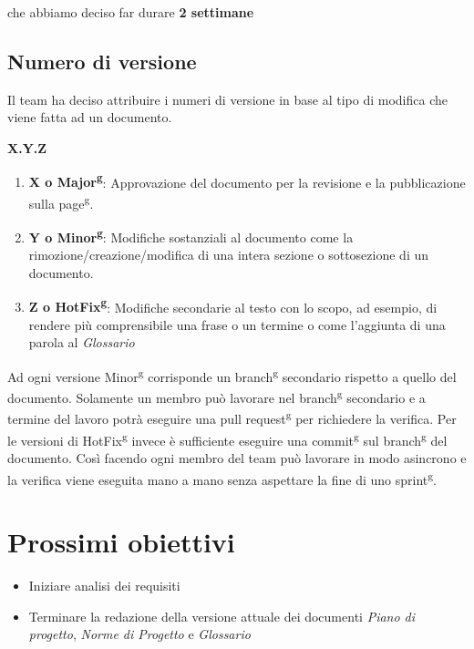 che abbiamo deciso far durare \textbf{2 settimane}
\subsection{Numero di versione}
Il team ha deciso attribuire i numeri di versione in base al tipo di modifica
che viene fatta ad un documento.
\begin{center}
    \textbf{X.Y.Z}
\end{center}
\begin{enumerate}
    \item \textbf{X o Major\textsuperscript{g}}: Approvazione del documento per la revisione e la pubblicazione sulla page\textsuperscript{g}.
    \item \textbf{Y o Minor\textsuperscript{g}}: Modifiche sostanziali al documento come la rimozione/creazione/modifica di una intera sezione o sottosezione di un documento.
    \item \textbf{Z o HotFix\textsuperscript{g}}: Modifiche secondarie al testo con lo scopo, ad esempio, di rendere più comprensibile una frase o un termine o come l'aggiunta di una parola al \textit{Glossario}
\end{enumerate}
Ad ogni versione Minor\textsuperscript{g} corrisponde un branch\textsuperscript{g} secondario rispetto a quello del documento. Solamente un membro può lavorare nel branch\textsuperscript{g} secondario e a termine del lavoro
potrà eseguire una pull request\textsuperscript{g} per richiedere la verifica. Per le versioni di HotFix\textsuperscript{g} invece è sufficiente eseguire una commit\textsuperscript{g} sul branch\textsuperscript{g} del documento.
Così facendo ogni membro del team può lavorare in modo asincrono e la verifica viene eseguita mano a mano senza aspettare la fine di uno sprint\textsuperscript{g}.
\section{Prossimi obiettivi}
\begin{itemize}
    \item Iniziare analisi dei requisiti
    \item Terminare la redazione della versione attuale dei documenti \textit{Piano di
              progetto}, \textit{Norme di Progetto} e \textit{Glossario}
\end{itemize}
